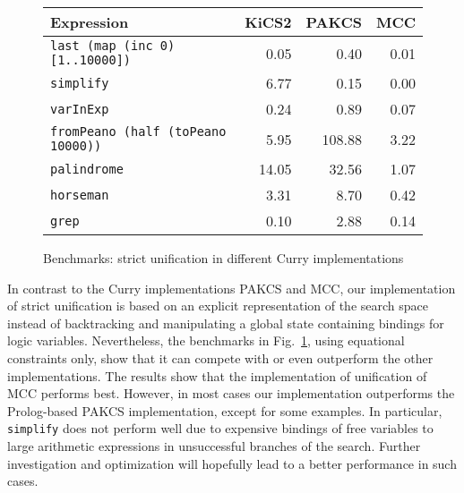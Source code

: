 \documentclass{llncs}
\newcommand{\code}[1]{\mbox{\small\texttt{#1}}}
\begin{document}
\begin{figure}[t]
\centering
\begin{tabular}{|l|r|r|r|}
\hline
Expression                              & KiCS2 & PAKCS  & MCC  \\
\hline
\code{last (map (inc 0) [1..10000])}   & 0.05  & 0.40   &  0.01\\
\code{simplify}                         & 6.77  & 0.15   & 0.00 \\
\code{varInExp}                         & 0.24  & 0.89   & 0.07 \\
\code{fromPeano (half (toPeano 10000))} & 5.95  & 108.88 & 3.22 \\
\code{palindrome}                       & 14.05 & 32.56  & 1.07 \\
\code{horseman}                         & 3.31  & 8.70   & 0.42 \\
\code{grep}                             & 0.10  & 2.88   & 0.14 \\
\hline
\end{tabular}
\caption{Benchmarks: strict unification in different Curry implementations}
 \label{fig:unification}
\end{figure}

In contrast to the Curry implementations PAKCS and MCC,
our implementation of strict unification is based
on an explicit representation of the search space instead of
backtracking and manipulating
a global state containing bindings for logic variables.
Nevertheless, the benchmarks in Fig.~\ref{fig:unification},
using equational constraints only,
show that it can compete with or even outperform the other implementations.
The results show that the implementation of unification
of MCC performs best. However, in most cases our implementation 
outperforms the Prolog-based PAKCS implementation, 
except for some examples. In particular, \code{simplify} does not perform well
due to expensive bindings of free variables to large arithmetic expressions
in unsuccessful branches of the search. Further investigation
and optimization will hopefully lead to a better performance in
such cases.
\end{document}
